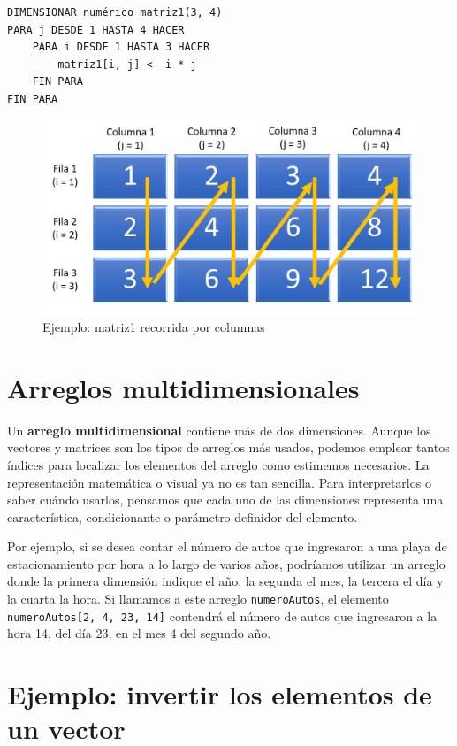 \documentclass[]{book}
\begin{document}
\begin{verbatim}
DIMENSIONAR numérico matriz1(3, 4)
PARA j DESDE 1 HASTA 4 HACER
    PARA i DESDE 1 HASTA 3 HACER
        matriz1[i, j] <- i * j
    FIN PARA
FIN PARA
\end{verbatim}

\begin{figure}

{\centering \includegraphics[width=0.8\linewidth]{images/13_matriz1bis} 

}

\caption{Ejemplo: matriz1 recorrida por columnas}\label{fig:matriz1bis}
\end{figure}

\section{Arreglos multidimensionales}\label{arreglos-multidimensionales}

Un \textbf{arreglo multidimensional} contiene más de dos dimensiones.
Aunque los vectores y matrices son los tipos de arreglos más usados,
podemos emplear tantos índices para localizar los elementos del arreglo
como estimemos necesarios. La representación matemática o visual ya no
es tan sencilla. Para interpretarlos o saber cuándo usarlos, pensamos
que cada uno de las dimensiones representa una característica,
condicionante o parámetro definidor del elemento.

Por ejemplo, si se desea contar el número de autos que ingresaron a una
playa de estacionamiento por hora a lo largo de varios años, podríamos
utilizar un arreglo donde la primera dimensión indique el año, la
segunda el mes, la tercera el día y la cuarta la hora. Si llamamos a
este arreglo \texttt{numeroAutos}, el elemento
\texttt{numeroAutos{[}2,\ 4,\ 23,\ 14{]}} contendrá el número de autos
que ingresaron a la hora 14, del día 23, en el mes 4 del segundo año.

\section{Ejemplo: invertir los elementos de un
vector}\label{ejemplo-invertir-los-elementos-de-un-vector}
\end{document}
